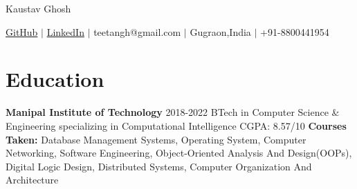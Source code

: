 \documentclass{article}
\begin{document}
\thispagestyle{empty}  %




\begin{center}
    \huge{Kaustav Ghosh} %

    \normalsize{
        \textmd{
            \href{https://www.github.com/teetangh}{GitHub} \(|\)
            \href{https://www.linkedin.com/in/kaustav-ghosh-1538651bb/}{LinkedIn} \(|\)
            teetangh@gmail.com \(|\)
            Gugraon,India \(|\)
            +91-8800441954
        }}
\end{center}


\section*{Education}

\textbf{Manipal Institute of Technology} \hfill \textmd{2018-2022}
\textmd{\newline \textmd{BTech in Computer Science \& Engineering specializing in Computational Intelligence}}
\hfill \textmd{CGPA: 8.57/10}
\newline
\textmd{\textbf{Courses Taken:} Database Management Systems, Operating System, Computer Networking, Software Engineering, Object-Oriented Analysis And Design(OOPs), Digital Logic Design, Distributed Systems, Computer Organization And Architecture}

\end{document}
